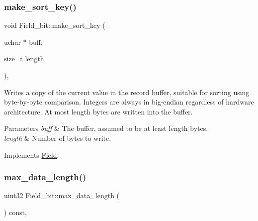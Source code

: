 \mbox{\label{classField__bit_a60fd8681fd22c528f2b997cb6dd68548}} 
\subsubsection{\texorpdfstring{make\+\_\+sort\+\_\+key()}{make\_sort\_key()}}
{\footnotesize\ttfamily void Field\+\_\+bit\+::make\+\_\+sort\+\_\+key (\begin{DoxyParamCaption}\item[{uchar $\ast$}]{buff,  }\item[{size\+\_\+t}]{length }\end{DoxyParamCaption})\hspace{0.3cm}{\ttfamily [inline]}, {\ttfamily [virtual]}}

Writes a copy of the current value in the record buffer, suitable for sorting using byte-\/by-\/byte comparison. Integers are always in big-\/endian regardless of hardware architecture. At most length bytes are written into the buffer.


\begin{DoxyParams}{Parameters}
{\em buff} & The buffer, assumed to be at least length bytes.\\
\hline
{\em length} & Number of bytes to write. \\
\hline
\end{DoxyParams}


Implements \mbox{\hyperlink{classField_af3bc27d237b6ae6ef3dc7a2aec3d79ac}{Field}}.

\mbox{\label{classField__bit_acc664ced1dd95a2370fc58e7bf6e70bc}} 
\subsubsection{\texorpdfstring{max\+\_\+data\+\_\+length()}{max\_data\_length()}}
{\footnotesize\ttfamily uint32 Field\+\_\+bit\+::max\+\_\+data\+\_\+length (\begin{DoxyParamCaption}{ }\end{DoxyParamCaption}) const\hspace{0.3cm}{\ttfamily [inline]}, {\ttfamily [virtual]}}


